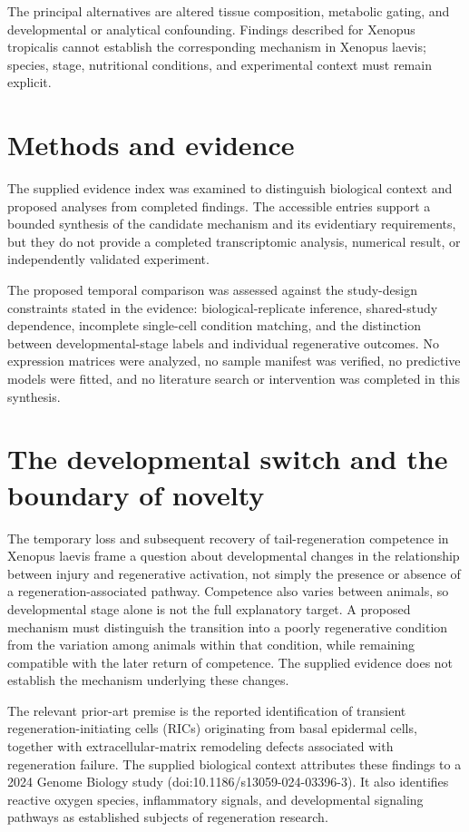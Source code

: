 \documentclass[11pt]{article}
\begin{document}
The principal alternatives are altered tissue composition, metabolic gating, and developmental or analytical confounding. Findings described for Xenopus tropicalis cannot establish the corresponding mechanism in Xenopus laevis; species, stage, nutritional conditions, and experimental context must remain explicit.

\section{Methods and evidence}
The supplied evidence index was examined to distinguish biological context and proposed analyses from completed findings. The accessible entries support a bounded synthesis of the candidate mechanism and its evidentiary requirements, but they do not provide a completed transcriptomic analysis, numerical result, or independently validated experiment.

The proposed temporal comparison was assessed against the study-design constraints stated in the evidence: biological-replicate inference, shared-study dependence, incomplete single-cell condition matching, and the distinction between developmental-stage labels and individual regenerative outcomes. No expression matrices were analyzed, no sample manifest was verified, no predictive models were fitted, and no literature search or intervention was completed in this synthesis.

\section{The developmental switch and the boundary of novelty}
The temporary loss and subsequent recovery of tail-regeneration competence in Xenopus laevis frame a question about developmental changes in the relationship between injury and regenerative activation, not simply the presence or absence of a regeneration-associated pathway. Competence also varies between animals, so developmental stage alone is not the full explanatory target. A proposed mechanism must distinguish the transition into a poorly regenerative condition from the variation among animals within that condition, while remaining compatible with the later return of competence. The supplied evidence does not establish the mechanism underlying these changes.

The relevant prior-art premise is the reported identification of transient regeneration-initiating cells (RICs) originating from basal epidermal cells, together with extracellular-matrix remodeling defects associated with regeneration failure. The supplied biological context attributes these findings to a 2024 Genome Biology study (doi:10.1186/s13059-024-03396-3). It also identifies reactive oxygen species, inflammatory signals, and developmental signaling pathways as established subjects of regeneration research.
\end{document}
